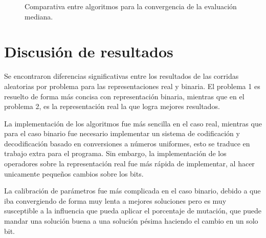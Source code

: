 \documentclass[runningheads]{llncs}
\begin{document}
\newpage

\begin{figure}[htbp]
	\centering
	\hfill
	\caption{Comparativa entre algoritmos para la convergencia de la evaluación mediana.}
	\label{fig:convergencia}
\end{figure}



\section{Discusión de resultados}

Se encontraron diferencias significativas entre los resultados de las corridas aleatorias por problema para las representaciones real y binaria. El problema 1 es resuelto de forma más concisa con representación binaria, mientras que en el problema 2, es la representación real la que logra mejores resultados.

La implementación de los algoritmos fue más sencilla en el caso real, mientras que para el caso binario fue necesario implementar un sistema de codificación y decodificación basado en conversiones a números uniformes, esto se traduce en trabajo extra para el programa. Sin embargo, la implementación de los operadores sobre la representación real fue más rápida de implementar, al hacer unicamente pequeños cambios sobre los bits.

La calibración de parámetros fue más complicada en el caso binario, debido a que iba convergiendo de forma muy lenta a mejores soluciones pero es muy susceptible a la influencia que pueda aplicar el porcentaje de mutación, que puede mandar una solución buena a una solución pésima haciendo el cambio en un solo bit.
\end{document}
